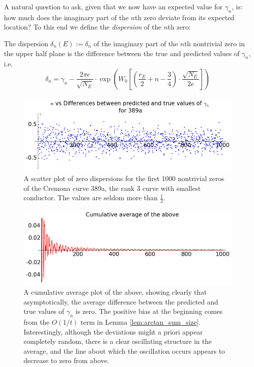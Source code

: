 A natural question to ask, given that we now have an expected value for $\gamma_n$, is: how much does the imaginary part of the $n$th zero deviate from its expected location? To this end we define the {\it dispersion} of the $n$th zero:
\begin{definition}
The dispersion $\delta_n(E) := \delta_n$ of the imaginary part of the $n$th nontrivial zero in the upper half plane is the difference between the true and predicted values of $\gamma_n$, i.e.
\begin{equation}
\delta_n = \gamma_n - \frac{2\pi e}{\sqrt{N_E}} \cdot \exp \left(W_0\left[\left(\frac{r_E}{2} +n - \frac{3}{4}\right)\cdot \frac{\sqrt{N_E}}{2 e}\right]\right)
\end{equation}
\end{definition}

\begin{figure}[!h]
    \centering
    \includegraphics[width=1.0\textwidth]{graphics/389a_zero_dispersions_scatterplot.png}
    \caption{A scatter plot of zero dispersions for the first 1000 nontrivial zeros of the Cremona curve 389a, the rank 3 curve with smallest conductor. The values are seldom more than $\frac{1}{2}$.}
    \label{fig:389a_zero_dispersions_scatterplot}
\end{figure}

\begin{figure}[!h]
    \centering
    \includegraphics[width=1.0\textwidth]{graphics/389a_zero_dispersions_cumulative_average.png}
    \caption{A cumulative average plot of the above, showing clearly that asymptotically, the average difference between the predicted and true values of $\gamma_n$ is zero. The positive bias at the beginning comes from the $O(1/t)$ term in Lemma \ref{lem:arctan_sum_size}. Interestingly, although the deviations might a priori appear completely random, there is a clear oscillating structure in the average, and the line about which the oscillation occurs appears to decrease to zero from above.}
    \label{fig:zero_dispersions_cumulative_average}
\end{figure}

